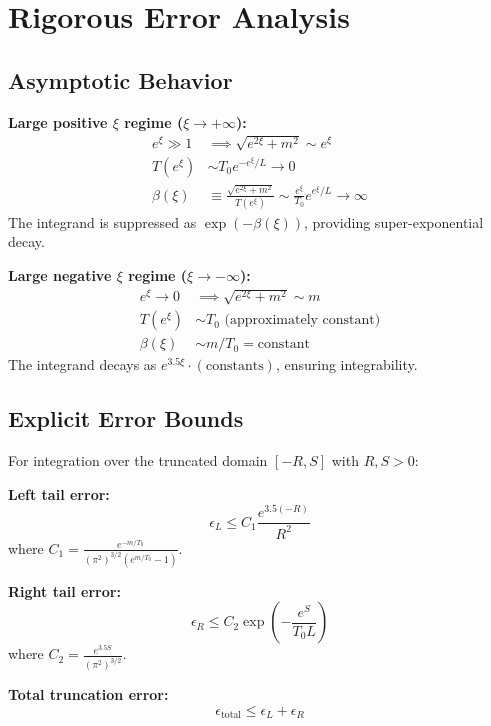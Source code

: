 \documentclass[12pt]{article}
\begin{document}
\section{Rigorous Error Analysis}

\subsection{Asymptotic Behavior}

\textbf{Large positive $\xi$ regime ($\xi \to +\infty$):}
\begin{align}
e^{\xi} \gg 1 &\implies \sqrt{e^{2\xi} + m^2} \sim e^{\xi} \nonumber \\
T(e^{\xi}) &\sim T_0 e^{-e^{\xi}/L} \to 0 \nonumber \\
\beta(\xi) &\equiv \frac{\sqrt{e^{2\xi} + m^2}}{T(e^{\xi})} \sim \frac{e^{\xi}}{T_0} e^{e^{\xi}/L} \to \infty
\end{align}
The integrand is suppressed as $\exp(-\beta(\xi))$, providing super-exponential decay.

\textbf{Large negative $\xi$ regime ($\xi \to -\infty$):}
\begin{align}
e^{\xi} \to 0 &\implies \sqrt{e^{2\xi} + m^2} \sim m \nonumber \\
T(e^{\xi}) &\sim T_0 \text{ (approximately constant)} \nonumber \\
\beta(\xi) &\sim m/T_0 = \text{constant}
\end{align}
The integrand decays as $e^{3.5\xi} \cdot (\text{constants})$, ensuring integrability.

\subsection{Explicit Error Bounds}

For integration over the truncated domain $[-R, S]$ with $R, S > 0$:

\textbf{Left tail error:}
\begin{equation}
\epsilon_L \leq C_1 \frac{e^{3.5(-R)}}{R^2}
\end{equation}
where $C_1 = \frac{e^{-m/T_0}}{(\pi^2)^{3/2}(e^{m/T_0} - 1)}$.

\textbf{Right tail error:}
\begin{equation}
\epsilon_R \leq C_2 \exp\left(-\frac{e^S}{T_0 L}\right)
\end{equation}
where $C_2 = \frac{e^{3.5S}}{(\pi^2)^{3/2}}$.

\textbf{Total truncation error:}
\begin{equation}
\epsilon_{\text{total}} \leq \epsilon_L + \epsilon_R
\end{equation}
\end{document}
